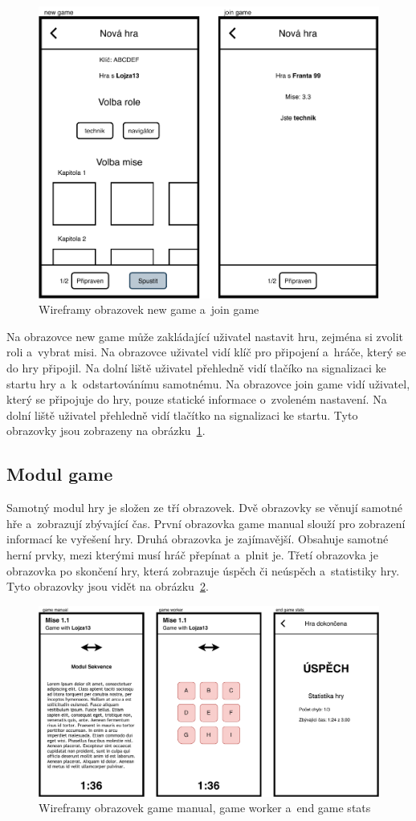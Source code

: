 \begin{figure}
    \centering
    \includegraphics[width=0.6\linewidth]{assets/design/wireframes/lobby.pdf}
    \caption{Wireframy obrazovek new game a~join game}
    \label{fig:ui-lobby}
\end{figure}

Na obrazovce new game může zakládající uživatel nastavit hru,
zejména si zvolit roli a~vybrat misi.
Na obrazovce uživatel vidí klíč pro připojení a~hráče,
který se do hry připojil.
Na dolní liště uživatel přehledně vidí tlačíko na signalizaci ke startu hry
a~k~odstartovánímu samotnému.
Na obrazovce join game vidí uživatel,
který se připojuje do hry,
pouze statické informace o~zvoleném nastavení.
Na dolní liště uživatel přehledně vidí tlačítko na signalizaci ke startu.
Tyto obrazovky jsou zobrazeny na obrázku~\ref{fig:ui-lobby}.

\subsection{Modul game}

Samotný modul hry je složen ze tří obrazovek.
Dvě obrazovky se věnují samotné hře a~zobrazují zbývající čas.
První obrazovka game manual slouží pro zobrazení informací ke vyřešení hry.
Druhá obrazovka je zajímavější.
Obsahuje samotné herní prvky,
mezi kterými musí hráč přepínat a~plnit je.
Třetí obrazovka je obrazovka po skončení hry,
která zobrazuje úspěch či neúspěch
a~statistiky hry.
Tyto obrazovky jsou vidět na obrázku~\ref{fig:ui-game}.

\begin{figure}
    \centering
    \includegraphics[width=1\linewidth]{assets/design/wireframes/game.pdf}
    \caption{Wireframy obrazovek game manual, game worker a~end game stats}
    \label{fig:ui-game}
\end{figure}
